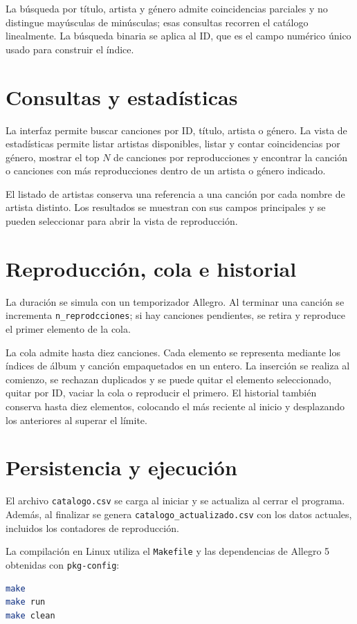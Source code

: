 \documentclass[11pt,a4paper]{article}
\begin{document}
La búsqueda por título, artista y género admite coincidencias parciales y no distingue mayúsculas de minúsculas; esas consultas recorren el catálogo linealmente. La búsqueda binaria se aplica al ID, que es el campo numérico único usado para construir el índice.

\section{Consultas y estadísticas}
La interfaz permite buscar canciones por ID, título, artista o género. La vista de estadísticas permite listar artistas disponibles, listar y contar coincidencias por género, mostrar el top $N$ de canciones por reproducciones y encontrar la canción o canciones con más reproducciones dentro de un artista o género indicado.

El listado de artistas conserva una referencia a una canción por cada nombre de artista distinto. Los resultados se muestran con sus campos principales y se pueden seleccionar para abrir la vista de reproducción.

\section{Reproducción, cola e historial}
La duración se simula con un temporizador Allegro. Al terminar una canción se incrementa \texttt{n\_reprodcciones}; si hay canciones pendientes, se retira y reproduce el primer elemento de la cola.

La cola admite hasta diez canciones. Cada elemento se representa mediante los índices de álbum y canción empaquetados en un entero. La inserción se realiza al comienzo, se rechazan duplicados y se puede quitar el elemento seleccionado, quitar por ID, vaciar la cola o reproducir el primero. El historial también conserva hasta diez elementos, colocando el más reciente al inicio y desplazando los anteriores al superar el límite.

\section{Persistencia y ejecución}
El archivo \texttt{catalogo.csv} se carga al iniciar y se actualiza al cerrar el programa. Además, al finalizar se genera \texttt{catalogo\_actualizado.csv} con los datos actuales, incluidos los contadores de reproducción.

La compilación en Linux utiliza el \texttt{Makefile} y las dependencias de Allegro 5 obtenidas con \texttt{pkg-config}:
\begin{lstlisting}[language=bash]
make
make run
make clean
\end{lstlisting}
\end{document}

